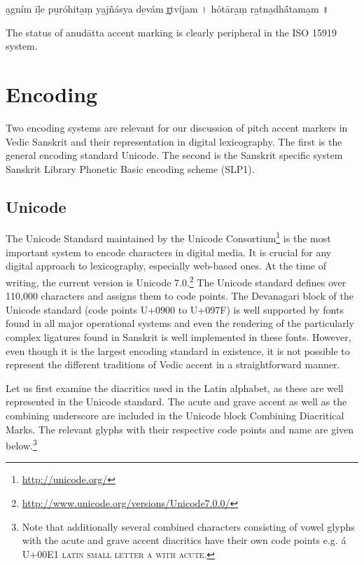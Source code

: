\begin{exe}
\ex\label{ex:rgsyslat} a̲gním īḷe pu̲róhita̲ṃ ya̲jñásya de̲vám r̥̲tvíjam {\devfont ।} hótāra̲ṃ ra̲tna̲dhā́tama̲m {\devfont ॥}
\end{exe}

The status of anudātta accent marking is clearly peripheral in the ISO 15919 system.

\chapter{Encoding}

Two encoding systems are relevant for our discussion of pitch accent markers in Vedic Sanskrit and their representation in digital lexicography. The first is the general encoding standard Unicode. The second is the Sanskrit specific system Sanskrit Library Phonetic Basic encoding scheme (SLP1).

\section{Unicode}

The Unicode Standard maintained by the Unicode Consortium\footnote{\url{http://unicode.org/}} is the most important system to encode characters in digital media. It is crucial for any digital approach to lexicography, especially web-based ones. At the time of writing, the current version is Unicode 7.0.\footnote{\url{http://www.unicode.org/versions/Unicode7.0.0/}} The Unicode standard defines over 110,000 characters and assigns them to code points. The Devanagari block of the Unicode standard (code points U+0900 to U+097F) is well supported by fonts found in all major operational systems and even the rendering of the particularly complex ligatures found in Sanskrit is well implemented in these fonts. However, even though it is the largest encoding standard in existence, it is not possible to represent the different traditions of Vedic accent in a straightforward manner. 

Let us first examine the diacritics used in the Latin alphabet, as these are well represented in the Unicode standard. The acute and grave accent as well as the combining underscore are included in the Unicode block Combining Diacritical Marks. The relevant glyphs with their respective code points and name are given below.\footnote{Note that additionally several combined characters consisting of vowel glyphs with the acute and grave accent diacritics have their own code points e.g. á U+00E1 \textsc{latin small letter a with acute}.}

